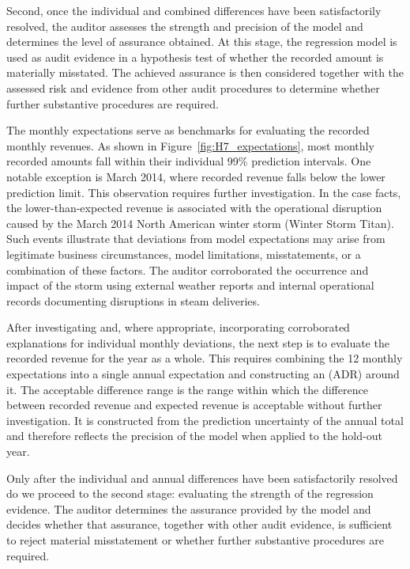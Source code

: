 Second, once the individual and combined differences have been satisfactorily resolved, the auditor assesses the strength and precision of the model and determines the level of assurance obtained. At this stage, the regression model is used as audit evidence in a hypothesis test of whether the recorded amount is materially misstated. The achieved assurance is then considered together with the assessed risk and evidence from other audit procedures to determine whether further substantive procedures are required.

The monthly expectations serve as benchmarks for evaluating the recorded monthly revenues. As shown in Figure~\ref{fig:H7_expectations}, most monthly recorded amounts fall within their individual 99\% prediction intervals. One notable exception is March 2014, where recorded revenue falls below the lower prediction limit. This observation requires further investigation. In the case facts, the lower-than-expected revenue is associated with the operational disruption caused by the March 2014 North American winter storm (Winter Storm Titan). Such events illustrate that deviations from model expectations may arise from legitimate business circumstances, model limitations, misstatements, or a combination of these factors. The auditor corroborated the occurrence and impact of the storm using external weather reports and internal operational records documenting disruptions in steam deliveries.

After investigating and, where appropriate, incorporating corroborated explanations for individual monthly deviations, the next step is to evaluate the recorded revenue for the year as a whole. This requires combining the 12 monthly expectations into a single annual expectation and constructing an  (ADR) around it. The acceptable difference range is the range within which the difference between recorded revenue and expected revenue is acceptable without further investigation. It is constructed from the prediction uncertainty of the annual total and therefore reflects the precision of the model when applied to the hold-out year.

Only after the individual and annual differences have been sa\-tis\-factorily resolved do we proceed to the second stage: evaluating the strength of the regression evidence. The auditor determines the assurance provided by the model and decides whether that assurance, together with other audit evidence, is sufficient to reject material misstatement or whether further substantive procedures are required.

